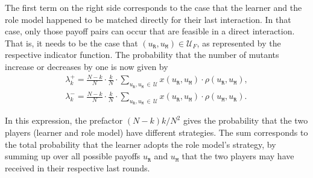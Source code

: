 \documentclass[11pt]{article}
\def\resident{\texttt{R}}
\def\mutant{\texttt{M}}
\theoremstyle{plainCl1}
\theoremstyle{plainCl2}
\begin{document}

\noindent
The first term on the right side corresponds to the case that the learner and
the role model happened to be matched directly for their last interaction. 
In that case, only those payoff pairs can occur that are feasible in a direct interaction. 
That is, it needs to be the case that $(u_\resident,u_\mutant)\in \mathcal{U}_F$, as represented by the respective indicator function. 
The probability that the number of mutants increase or decreases by one is now given by
\begin{equation}
\begin{array}{l}
\displaystyle \lambda^+_k=\frac{N\!-\!k}{N}\cdot \frac{k}{N}\cdot \sum_{u_\resident,u_\mutant\,\in\,\mathcal{U}} x(u_\resident,u_\mutant)\cdot \rho(u_\resident,u_\mutant), \\[0.5cm]
\displaystyle \lambda^-_k=\frac{N\!-\!k}{N}\cdot \frac{k}{N}\cdot \sum_{u_\resident,u_\mutant \,\in\, \mathcal{U}} x(u_\resident,u_\mutant)\cdot \rho(u_\mutant,u_\resident).
\end{array}
\end{equation}

\noindent
In this expression, the prefactor $(N\!-\!k)k/N^2$ gives the probability that the two players (learner and role model) have different strategies. 
The sum corresponds to the total probability that the learner
adopts the role model's strategy, by summing up over all possible payoffs $u_\resident$ and $u_\mutant$ that
the two players may have received in their respective last rounds. 

\end{document}

